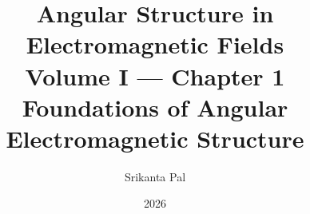 

\title{Angular Structure in Electromagnetic Fields\\[0.4em]
  \large Volume I --- Chapter 1\\[0.3em]
  \normalsize Foundations of Angular Electromagnetic Structure}
\author{Srikanta Pal}
\date{2026}


\makeatletter
\begingroup
\setcounter{chapter}{1}
\label{ch:02}
\label{ch:03}
\label{ch:04}
\setcounter{chapter}{0}
\endgroup
\makeatother
\maketitle
\tableofcontents
\thispagestyle{empty}
\clearpage





\let\cleardoublepage\clearpage




